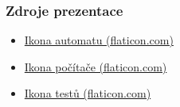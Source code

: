 



\appendix{}
\begin{frame}
  \frametitle{Zdroje prezentace}
  \begin{itemize}
    \item \href{https://www.flaticon.com/free-icon/intelligence_14510304?related_id=14510304}{Ikona automatu (flaticon.com)}
    \item \href{https://www.flaticon.com/free-icon/programming_6062646?related_id=6062646}{Ikona počítače (flaticon.com)}
    \item \href{https://www.flaticon.com/free-icon/search_3281188?related_id=3281188}{Ikona testů (flaticon.com)}
  \end{itemize}
  \bigskip
\end{frame}
